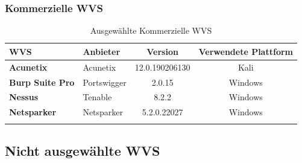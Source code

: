 \documentclass[12pt,oneside,a4paper,parskip]{scrbook}
\begin{document}
    \subsubsection{Kommerzielle WVS}
      \begin{table}[H]
        \centering
        \begin{tabular}{|p{4cm}|l|c|c|}
        \hline
        \textbf{WVS}            & \textbf{Anbieter} & \textbf{Version} & \textbf{Verwendete Plattform}  \\
        \hline
        \textbf{Acunetix}       & Acunetix          & 12.0.190206130   & Kali                        \\
        \hline
        \textbf{Burp Suite Pro} & Portswigger       & 2.0.15           & Windows                       \\
        \hline
        \textbf{Nessus}         & Tenable           & 8.2.2            & Windows                       \\
        \hline
        \textbf{Netsparker}     & Netsparker        & 5.2.0.22027      & Windows                       \\
        \hline
                              &                   &                  &                               \\
        \hline
        \end{tabular}
        \caption[Ausgewählte Kommerzielle WVS]{Ausgewählte Kommerzielle WVS}
      \end{table}

  \subsection{Nicht ausgewählte WVS}
\end{document}

